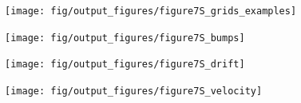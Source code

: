 \documentclass[a4paper,12pt]{article}
\newcommand{\ssc}[3]{\ensuremath{#1_{\text{#2}_{\text{#3}}}}}
\newcommand{\gE      }{\ssc{g}      {\scriptsize{E}}{}}
\newcommand{\gI      }{\ssc{g}      {\scriptsize{I}}{}}
\begin{document}
{%
%

\setcounter{figure}{0}
\renewcommand{\figurename}{Figure 7 - figure supplement}


\begin{figure}[p]
    \internallinenumbers
    \centering
        \texttt{[image: fig/output\_figures/figure7S\_grids\_examples]}
    \caption{}
\end{figure}

\clearpage

\begin{figure}[p]
    \internallinenumbers
    \centering
        \texttt{[image: fig/output\_figures/figure7S\_bumps]}
    \caption{}
\end{figure}

\clearpage

\begin{figure}[ht!]
    \internallinenumbers
    \centering
        \texttt{[image: fig/output\_figures/figure7S\_drift]}
    \caption{}
\end{figure}

\clearpage

\begin{figure}[ht!]
    \internallinenumbers
    \centering
        \texttt{[image: fig/output\_figures/figure7S\_velocity]}
    \caption{}
\end{figure}

}
\end{document}
